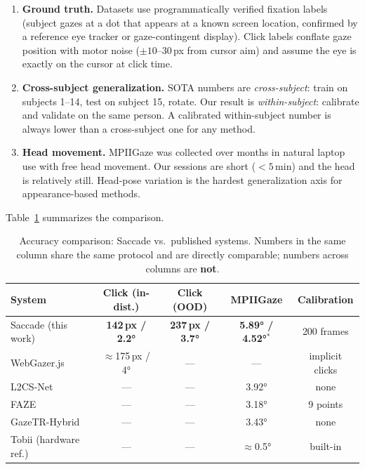 \documentclass[11pt,a4paper]{article}
\begin{document}
\begin{enumerate}
  \item \textbf{Ground truth.} Datasets use programmatically verified fixation labels (subject gazes at a dot that appears at a known screen location, confirmed by a reference eye tracker or gaze-contingent display). Click labels conflate gaze position with motor noise ($\pm 10$--$30$\,px from cursor aim) and assume the eye is exactly on the cursor at click time.

  \item \textbf{Cross-subject generalization.} SOTA numbers are \textit{cross-subject}: train on subjects 1--14, test on subject 15, rotate. Our result is \textit{within-subject}: calibrate and validate on the same person. A calibrated within-subject number is always lower than a cross-subject one for any method.

  \item \textbf{Head movement.} MPIIGaze was collected over months in natural laptop use with free head movement. Our sessions are short ($<5$\,min) and the head is relatively still. Head-pose variation is the hardest generalization axis for appearance-based methods.
\end{enumerate}

Table~\ref{tab:eval_comparison} summarizes the comparison.

\begin{table}[H]
\centering
\caption{Accuracy comparison: Saccade vs.\ published systems. Numbers in the same column share the same protocol and are directly comparable; numbers across columns are \textbf{not}.}
\label{tab:eval_comparison}
\begin{tabular}{lcccc}
\toprule
\textbf{System} & \textbf{Click (in-dist.)} & \textbf{Click (OOD)} & \textbf{MPIIGaze} & \textbf{Calibration} \\
\midrule
Saccade (this work) & \textbf{142\,px / 2.2°} & \textbf{237\,px / 3.7°} & \textbf{5.89° / 4.52°$^*$} & 200 frames \\
WebGazer.js~\cite{papoutsaki2016webgazer} & $\approx$175\,px / 4° & — & — & implicit clicks \\
L2CS-Net~\cite{abdelrahman2022l2cs} & — & — & 3.92° & none \\
FAZE~\cite{park2019faze} & — & — & 3.18° & 9 points \\
GazeTR-Hybrid~\cite{cheng2022gazetr} & — & — & 3.43° & none \\
Tobii (hardware ref.) & — & — & $\approx$0.5° & built-in \\
\bottomrule
\end{tabular}
\end{table}
\end{document}
